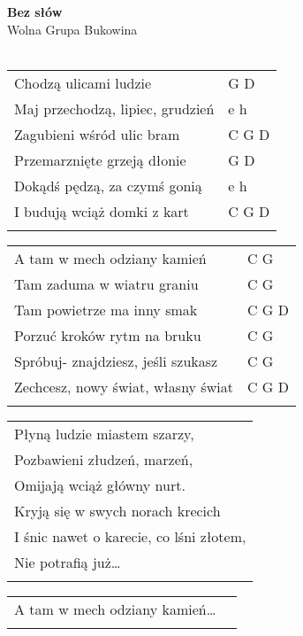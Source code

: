 \documentclass[a5paper]{article}
\begin{document}


\noindent
\fontsize{12pt}{15pt}\selectfont
\textbf{Bez słów} \\
\fontsize{8pt}{10pt}\selectfont
Wolna Grupa Bukowina \\ \\
\fontsize{10pt}{12pt}\selectfont
{}
\begin{tabular}{@{}p{9cm}p{3cm}@{}}
\noindent
Chodzą ulicami ludzie & G D \\
Maj przechodzą, lipiec, grudzień & e h \\
Zagubieni wśród ulic bram & C G D \\
Przemarznięte grzeją dłonie & G D \\
Dokądś pędzą, za czymś gonią & e h \\
I budują wciąż domki z kart & C G D \\ \\
\end{tabular}

\noindent
\begin{tabular}{@{}p{8cm}p{3cm}@{}}
A tam w mech odziany kamień & C G \\
Tam zaduma w wiatru graniu & C G \\
Tam powietrze ma inny smak & C G D \\
Porzuć kroków rytm na bruku & C G \\
Spróbuj- znajdziesz, jeśli szukasz & C G \\
Zechcesz, nowy świat, własny świat & C G D \\ \\
\end{tabular}

\noindent
\begin{tabular}{@{}p{9.5cm}@{}}
Płyną ludzie miastem szarzy, \\
Pozbawieni złudzeń, marzeń, \\
Omijają wciąż główny nurt. \\
Kryją się w swych norach krecich \\
I śnic nawet o karecie, co lśni złotem, \\
Nie potrafią już… \\ \\
\end{tabular}

\noindent
\begin{tabular}{@{}p{8.5cm}p{3cm}@{}} 
A tam w mech odziany kamień… \\ \\
\end{tabular} 
\end{document}
